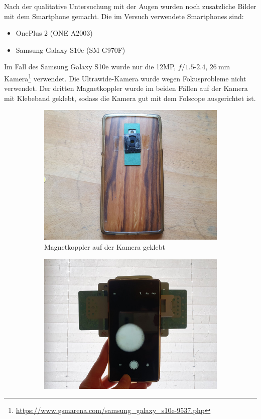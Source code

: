 		Nach der qualitative Untersuchung mit der Augen wurden noch zusatzliche Bilder mit dem Smartphone gemacht. Die im Versuch verwendete Smartphones sind:
		\begin{itemize}
			\item OnePlus 2 (ONE A2003)
			\item Samsung Galaxy S10e (SM-G970F)
		\end{itemize}
		Im Fall des Samsung Galaxy S10e wurde nur die 12MP, $f/1.5$-$2.4$, $\SI{26}{\milli\meter}$ Kamera\footnote{\url{https://www.gsmarena.com/samsung\_galaxy\_s10e-9537.php}} verwendet. Die Ultrawide-Kamera wurde wegen Fokusprobleme nicht verwendet. Der dritten Magnetkoppler wurde im beiden Fällen auf der Kamera mit Klebeband geklebt, sodass die Kamera gut mit dem Folscope ausgerichtet ist. 
		\begin{figure}[H]
			\centering
			\begin{subfigure}[b]{0.45\textwidth}
				\includegraphics[width=\textwidth]{images/tv2/build-04.jpg}
				\caption{Magnetkoppler auf der Kamera geklebt}
			\end{subfigure}
			\hspace{5pt}
			\begin{subfigure}[b]{0.45\textwidth}
				\includegraphics[width=\textwidth]{images/tv2/build-05.jpg}

\end{subfigure}
\end{figure}
